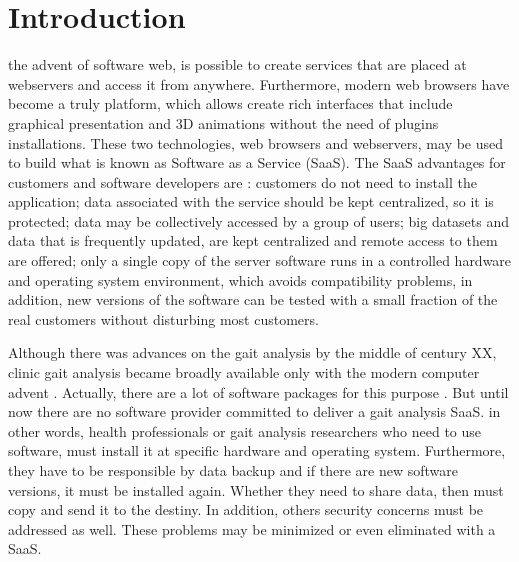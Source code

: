 \documentclass[journal]{IEEEtran}
\begin{document}
\section{Introduction}
% 
% 
% 
% 
 the advent of software web, is possible to create services
that are placed at webservers and access it  from anywhere.
Furthermore, modern web browsers have become a truly platform, which allows
create rich interfaces that include graphical presentation and 3D animations
without the need of plugins installations.
These two technologies, web browsers and webservers, may be used to build
what is known as Software as a Service (SaaS). The SaaS advantages for 
customers and software developers are \cite{Fox2012}: customers do not need
to install the application; data associated with the service should be kept centralized,
so it is protected; data may be collectively accessed by a group of users;
big datasets and data that is frequently updated, are kept centralized 
and remote access to them are offered; only a single copy of the server software
runs in a controlled hardware and operating system environment, which avoids
compatibility problems, in addition, new versions of the software can be 
tested with a small fraction of the real customers without disturbing most
customers.

Although there was advances on the gait analysis by the middle of century XX, 
clinic gait analysis became broadly available only
with the modern computer advent \cite{Baker2007}.
Actually, there are a lot of software packages for this purpose \cite{Moraes2003}.
But until now there are no software provider committed to deliver a 
gait analysis SaaS. in other words, health professionals or gait analysis researchers
who need to use software, must install it at specific hardware and
operating system. Furthermore, they have to be responsible by data backup and if there are
new software versions, it must be installed again. Whether they
need to share data, then must copy and send it to the destiny. In addition, others
security concerns must be addressed as well.
These problems may be minimized or even eliminated with a SaaS.
\end{document}
